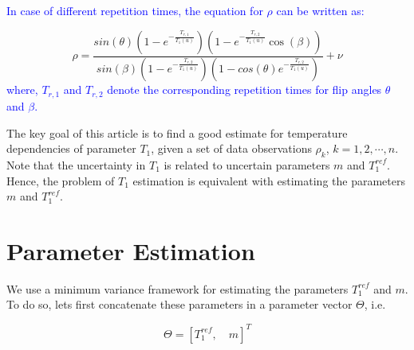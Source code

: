 \documentclass[3p,times]{article}
\begin{document}
\textcolor{blue}{In case of different repetition times, the equation for $\rho$ can be written as:}

\begin{equation}
\rho = \frac{sin(\theta)\left(1-e^{-\frac{T_{r,1}}{T_1(u)}}\right)\left(1-e^{-\frac{T_{r,2}}{T_1(u)}}\cos(\beta)\right)}{sin(\beta)\left(1-e^{-\frac{T_{r,2}}{T_1(u )}}\right)\left(1-cos(\theta)e^{-\frac{T_{r,2}}{T_1(u)}}\right)}+\nu
\end{equation}
\textcolor{blue}{where, $T_{r,1}$ and $T_{r,2}$ denote the corresponding repetition times for flip angles $\theta$ and $\beta$.}



The key goal of this article is to find a good estimate for temperature dependencies of parameter $T_1$, given a set of data observations $\rho_k$, $k=1,2,\cdots,n$. Note that the uncertainty in $T_1$ is related to uncertain parameters $m$ and $T_1^{ref}$. Hence, the problem of $T_1$ estimation is equivalent with estimating the parameters $m$ and $T_1^{ref}$.

\section*{Parameter Estimation}\label{sec:est}
We use a minimum variance framework for estimating the parameters $T_1^{ref}$ and $m$. To do so, lets first concatenate these parameters in a parameter vector $\Theta$, i.e.

\[\Theta = [T_1^{ref},\quad m]^T\]\nonumber
\end{document}
